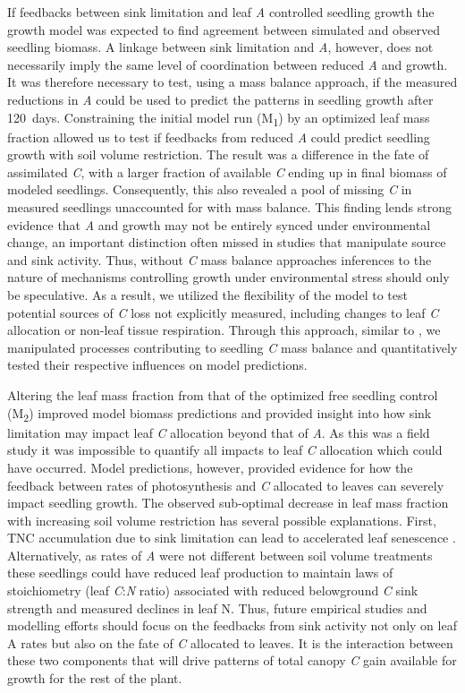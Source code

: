 \documentclass[a4paper]{article}\usepackage[]{graphicx}\usepackage[]{color}
\begin{document}
If feedbacks between sink limitation and leaf \textit{A} controlled seedling growth the growth model was expected to find agreement between simulated and observed seedling biomass. A linkage between sink limitation and \textit{A}, however, does not necessarily imply the same level of coordination between reduced \textit{A} and growth. It was therefore necessary to test, using a mass balance approach, if the measured reductions in \textit{A} could be used to predict the patterns in seedling growth after 120~days. Constraining the initial model run (M\textsubscript{1}) by an optimized leaf mass fraction allowed us to test if feedbacks from reduced \textit{A} could predict seedling growth with soil volume restriction. The result was a difference in the fate of assimilated \textit{C}, with a larger fraction of available \textit{C} ending up in final biomass of modeled seedlings. Consequently, this also revealed a pool of missing \textit{C} in measured seedlings unaccounted for with mass balance. This finding lends strong evidence that \textit{A} and growth may not be entirely synced under environmental change, an important distinction often missed in studies that manipulate source and sink activity. Thus, without \textit{C} mass balance approaches inferences to the nature of mechanisms controlling growth under environmental stress should only be speculative. As a result, we utilized the flexibility of the model to test potential sources of \textit{C} loss not explicitly measured, including changes to leaf \textit{C} allocation or non-leaf tissue respiration.  Through this approach, similar to \citep{lohier2014explaining}, we manipulated processes contributing to seedling \textit{C} mass balance and quantitatively tested their respective influences on model predictions. 

Altering the leaf mass fraction from that of the optimized free seedling control (M\textsubscript{2}) improved model biomass predictions and provided insight into how sink limitation may impact leaf \textit{C} allocation beyond that of \textit{A}. As this was a field study it was impossible to quantify all impacts to leaf \textit{C} allocation which could have occurred. Model predictions, however, provided evidence for how the feedback between rates of photosynthesis and \textit{C} allocated to leaves can severely impact seedling growth. The observed sub-optimal decrease in leaf mass fraction with increasing soil volume restriction has several possible explanations.  First, TNC accumulation due to sink limitation can lead to accelerated leaf senescence \citep{paul2001sink}. Alternatively, as rates of \textit{A} were not different between soil volume treatments these seedlings could have reduced leaf production to maintain laws of stoichiometry (leaf \textit{C}:\textit{N} ratio) associated with reduced belowground \textit{C} sink strength and measured declines in leaf N. Thus, future empirical studies and modelling efforts should focus on the feedbacks from sink activity not only on leaf A rates but also on the fate of \textit{C} allocated to leaves.  It is the interaction between these two components that will drive patterns of total canopy \textit{C} gain available for growth for the rest of the plant.
\end{document}
